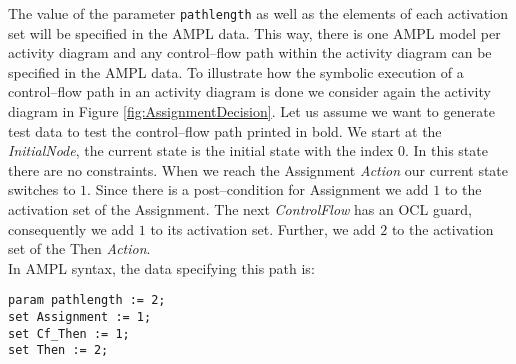 \documentclass[runningheads,a4paper]{llncs}%
\newcommand{\UMLType}[1]{\textsf{\textit{#1}}} %
\newcommand{\AMPLCode}[1]{\texttt{#1}}
\begin{document}
The value of the parameter \AMPLCode{pathlength} as well as the elements of each activation set will be specified in the AMPL data. This way, there is one AMPL model per activity diagram and any control--flow path within the activity diagram can be specified in the AMPL data. To illustrate how the symbolic execution of a control--flow path in an activity diagram is done we consider again the activity diagram in Figure \ref{fig:AssignmentDecision}. Let us assume we want to generate test data to test the control--flow path printed in bold. We start at the \UMLType{InitialNode}, the current state is the initial state with the index $0$. In this state there are no constraints. When we reach the Assignment \UMLType{Action} our current state switches to $1$. Since there is a post--condition for Assignment we add $1$ to the activation set of the Assignment. The next \UMLType{ControlFlow} has an OCL guard, consequently we add $1$ to its activation set. Further, we add $2$ to the activation set of the Then \UMLType{Action}.\\%
In AMPL syntax, the data specifying this path is:%
\begin{lstlisting}[basicstyle=\ttfamily,language=ampl]
param pathlength := 2;
set Assignment := 1;
set Cf_Then := 1;
set Then := 2;
\end{lstlisting}%
\end{document}
